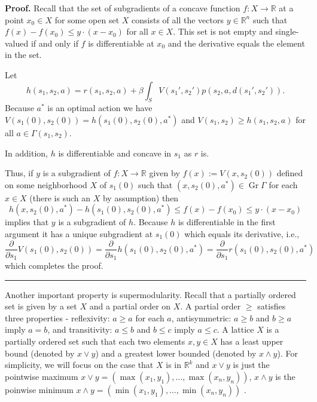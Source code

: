 \documentclass[letter,11pt]{article}
\newenvironment {proof}[1][Proof]{\noindent \textbf {#1.} }{\ \rule {0.5em}{0.5em}}
\begin{document}
\begin{proof}
 Recall that the set of subgradients of a concave function $f:X \rightarrow \mathbb{R}$ at a point $x_{0} \in X$ for some open set $X$ consists of all the vectors $y \in \mathbb{R}^{n}$ such that $ f(x) -f(x_{0}) \leq y \cdot (x-x_{0}) $ for all $x \in X$. This set is not empty and single-valued if and only if $f$ is differentiable at $x_{0}$ and the derivative equals the element in the set.


   Let $$h(s_{1},s_{2},a) =  r(s_{1},s_{2},a)  + \beta \int _{S} V(s_{1}',s_{2}')p(s_{2},a,d(s_{1}',s_{2}')) .$$ 
 Because $a^{*}$ is an optimal action we have $V(s_{1}(0),s_{2}(0)) = h(s_{1}(0),s_{2}(0),a^{*})$ and $V(s_{1},s_{2}) \geq  h(s_{1},s_{2},a)$ for all $a \in \Gamma(s_{1},s_{2})$.  

  In addition, $h$ is differentiable and concave in $s_{1}$ as $r$ is.
 
 Thus, if $y$ is a subgradient of $f:X \rightarrow \mathbb{R}$ given by $f(x) := V(x,s_{2}(0))$ defined on some neighborhood $X$ of $s_{1}(0)$ such that $(x,s_{2}(0),a^{*}) \in \operatorname{Gr} \Gamma$ for each $x \in X$ (there is such an $X$ by assumption) then 
$$h(x,s_{2}(0),a^{*}) - h(s_{1}(0),s_{2}(0),a^{*}) \leq f(x) -f(x_{0}) \leq y \cdot (x-x_{0})  $$
implies that $y$ is a subgradient of $h$. Because $h$ is differentiable in the first argument it has a unique subgradient at $s_{1}(0)$ which equals its derivative, i.e., 
 $$\frac{\partial }{\partial s_{1} } V(s_{1}(0),s_{2}(0)) =  \frac{\partial }{\partial s_{1} } h(s_{1}(0),s_{2}(0),a^{*}) = \frac{\partial }{\partial s_{1} } r(s_{1}(0),s_{2}(0),a^{*})$$
 which completes the proof. 
\end{proof}



Another important property is supermodularity. Recall that a partially ordered set is given by a set $X$ and a partial order on $X$. A partial order $\geq$ satisfies three properties - reflexivity: $a \geq a$ for each $a$, antisymmetric: $a \geq b$ and $b \geq a$ imply $a=b$, and transitivity: $a \leq b$ and $b \leq c$ imply $a \leq c$. A lattice $X$ is a partially ordered set such that each two elements $x,y \in X$ has a least upper bound (denoted by $x \lor y$) and a greatest lower bounded (denoted by $x \land y$). For simplicity, we will focus on the case that $X$ is in $\mathbb{R}^{k}$ and $x \lor y$ is just the pointwise maximum $x \lor y = (\max (x_{1} , y_{1}) , \ldots, \max (x_{n},y_{n}) )  $, $x \land y$ is the poinwise minimum $x \land y = (\min (x_{1} , y_{1}) , \ldots, \min (x_{n},y_{n}) )  $ . 
\end{document}
